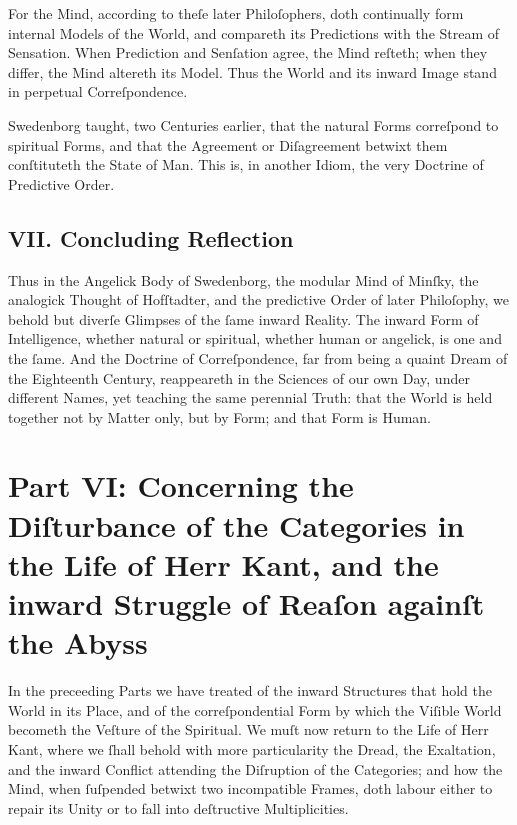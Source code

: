 \documentclass[12pt]{article}
\begin{document}
For the Mind, according to theſe later Philoſophers, doth continually form 
internal Models of the World, and compareth its Predictions with the Stream of 
Sensation. When Prediction and Senſation agree, the Mind reſteth; when they 
differ, the Mind altereth its Model. Thus the World and its inward Image stand 
in perpetual Correſpondence.

Swedenborg taught, two Centuries earlier, that the natural Forms correſpond to 
spiritual Forms, and that the Agreement or Diſagreement betwixt them conſtituteth 
the State of Man. This is, in another Idiom, the very Doctrine of Predictive 
Order.

\subsection*{VII. Concluding Reflection}

Thus in the Angelick Body of Swedenborg, the modular Mind of Minſky, the 
analogick Thought of Hofſtadter, and the predictive Order of later Philoſophy, 
we behold but diverſe Glimpses of the ſame inward Reality. The inward Form of 
Intelligence, whether natural or spiritual, whether human or angelick, is one 
and the ſame. And the Doctrine of Correſpondence, far from being a quaint 
Dream of the Eighteenth Century, reappeareth in the Sciences of our own Day, 
under different Names, yet teaching the same perennial Truth: that the World is 
held together not by Matter only, but by Form; and that Form is Human.

\newpage

\section*{Part VI: Concerning the Diſturbance of the Categories in the Life of Herr Kant, and the inward Struggle of Reaſon againſt the Abyss}

In the preceeding Parts we have treated of the inward Structures that hold the 
World in its Place, and of the correſpondential Form by which the Viſible 
World becometh the Veſture of the Spiritual. We muſt now return to the Life of 
Herr Kant, where we ſhall behold with more particularity the Dread, the 
Exaltation, and the inward Conflict attending the Diſruption of the 
Categories; and how the Mind, when ſuſpended betwixt two incompatible Frames, 
doth labour either to repair its Unity or to fall into deſtructive 
Multiplicities.
\end{document}
